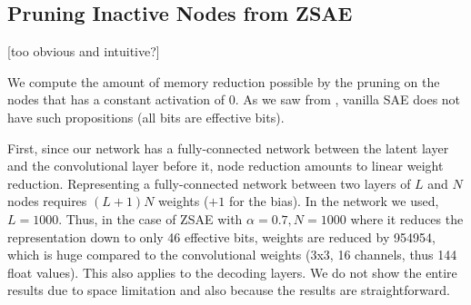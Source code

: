 \subsection{Pruning Inactive Nodes from ZSAE}

[too obvious and intuitive?]

We compute the amount of memory reduction possible by the pruning on the nodes
that has a constant activation of 0. As we saw from ,
vanilla SAE does not have such propositions (all bits are effective bits).

First, since our network has a fully-connected network between the
latent layer and the convolutional layer before it, node reduction
amounts to linear weight reduction.  Representing a fully-connected
network between two layers of $L$ and $N$ nodes requires $(L+1)N$
weights ($+1$ for the bias).
In the network we used, $L=1000$. Thus, in the case of ZSAE with $\alpha=0.7, N=1000$
where it reduces the representation down to only 46 effective bits, weights are reduced by 954954,
which is huge compared to the convolutional weights (3x3, 16 channels, thus 144 float values).
This also applies to the decoding layers.
We do not show the entire results due to space limitation and also because the results are straightforward.


% 
% 

